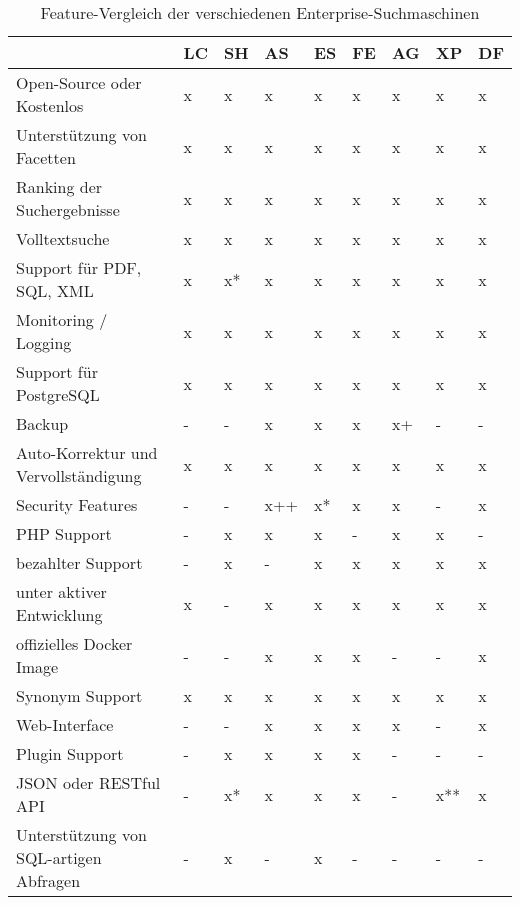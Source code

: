 \begin{table} %
	\centering
		\begin{tabular}{l | l | l | l | l | l | l | l | l}
		& \textbf{LC} & \textbf{SH} & \textbf{AS} & \textbf{ES}  & \textbf{FE} & \textbf{AG} & \textbf{XP} & \textbf{DF} \\
        \hline
        Open-Source oder Kostenlos                  & x & x  & x & x  & x & x  & x & x \\
        Unterstützung von Facetten                  & x & x  & x & x  & x & x  & x & x \\
        Ranking der Suchergebnisse                  & x & x  & x & x  & x & x  & x & x \\
        Volltextsuche                               & x & x  & x & x  & x & x  & x & x \\
        Support für PDF, SQL, XML                   & x & x* & x & x  & x & x  & x & x \\
        Monitoring / Logging                        & x & x  & x & x  & x & x  & x & x \\
        \hline
        Support für PostgreSQL                      & x & x  & x  & x  & x & x  & x & x \\
        Backup                                      & - & -  & x  & x  & x & x+ & - & - \\
        Auto-Korrektur und Vervollständigung        & x & x  & x  & x  & x & x  & x & x \\
        Security Features                           & - & -  & x++ & x* & x & x  & - & x \\
        PHP Support                                 & - & x  & x  & x  & - & x  & x & - \\
        bezahlter Support                           & - & x  & -  & x  & x & x  & x & x \\
        \hline
        unter aktiver Entwicklung                   & x & -  & x  & x  & x & x  & x & x \\
        offizielles Docker Image                    & - & -  & x  & x  & x & -  & - & x \\
        Synonym Support                             & x & x  & x  & x  & x & x  & x & x \\
        Web-Interface                               & - & -  & x  & x  & x & x  & - & x \\
        Plugin Support                              & - & x  & x  & x  & x & -  & - & - \\
        JSON oder RESTful API                       & - & x* & x  & x  & x & -  & x** & x \\
        Unterstützung von SQL-artigen Abfragen      & - & x  & -  & x  & - & -  & - & - \\
		\end{tabular}
    \caption{Feature-Vergleich der verschiedenen Enterprise-Suchmaschinen }
    \label{vglTable}


\end{table}
